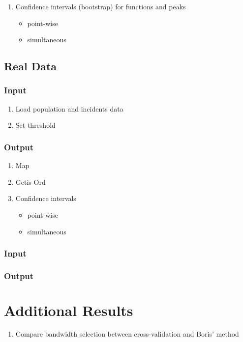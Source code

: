 \begin{singlespace*}
\begin{enumerate}
\item Confidence intervals (bootstrap) for functions and peaks
	\begin{itemize}
	\item point-wise
	\item simultaneous
	\end{itemize}
\end{enumerate}

\subsection{Real Data}

\subsubsection{Input}

\begin{enumerate}
\item Load population and incidents data
\item Set threshold
\end{enumerate}

\subsubsection{Output}
\begin{enumerate}
\item Map
\item Getis-Ord
\item Confidence intervals
	\begin{itemize}
	\item point-wise
	\item simultaneous
	\end{itemize}
\end{enumerate}

\subsubsection{Input}

\subsubsection{Output}

\section{Additional Results}

\begin{enumerate}
\item Compare bandwidth selection between cross-validation and Boris' method
\end{enumerate}


\end{singlespace*}
